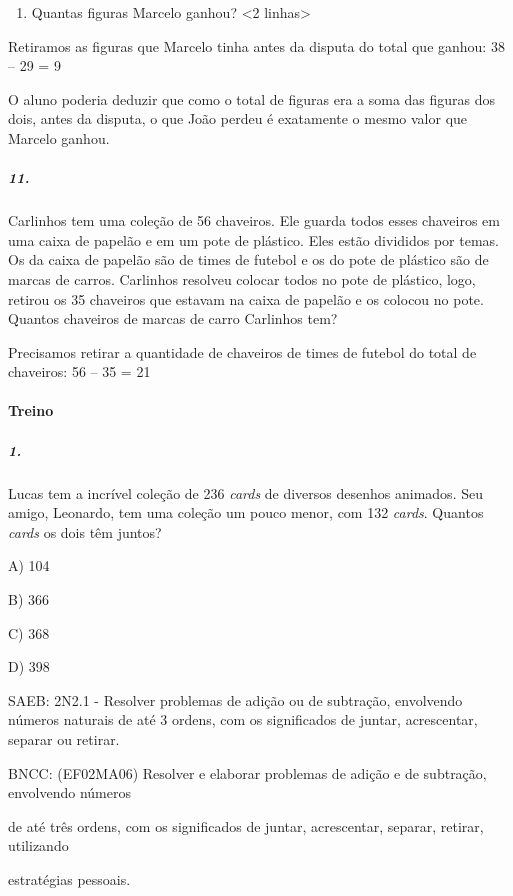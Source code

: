 \begin{enumerate}
\def\labelenumi{\Alph{enumi})}
\item
  Quantas figuras Marcelo ganhou? \textless{}2 linhas\textgreater{}
\end{enumerate}

Retiramos as figuras que Marcelo tinha antes da disputa do total que
ganhou: 38 -- 29 = 9

O aluno poderia deduzir que como o total de figuras era a soma das
figuras dos dois, antes da disputa, o que João perdeu é exatamente o
mesmo valor que Marcelo ganhou.

\subparagraph{11.}\label{section-24}

Carlinhos tem uma coleção de 56 chaveiros. Ele guarda todos esses
chaveiros em uma caixa de papelão e em um pote de plástico. Eles estão
divididos por temas. Os da caixa de papelão são de times de futebol e os
do pote de plástico são de marcas de carros. Carlinhos resolveu colocar
todos no pote de plástico, logo, retirou os 35 chaveiros que estavam na
caixa de papelão e os colocou no pote. Quantos chaveiros de marcas de
carro Carlinhos tem?

Precisamos retirar a quantidade de chaveiros de times de futebol do
total de chaveiros: 56 -- 35 = 21

\paragraph{Treino}\label{treino-1}

\subparagraph{1.}\label{section-25}

Lucas tem a incrível coleção de 236 \emph{cards} de diversos desenhos
animados. Seu amigo, Leonardo, tem uma coleção um pouco menor, com 132
\emph{cards}. Quantos \emph{cards} os dois têm juntos?

A) 104

B) 366

C) 368

D) 398

SAEB: 2N2.1 - Resolver problemas de adição ou de subtração, envolvendo
números naturais de até 3 ordens, com os significados de juntar,
acrescentar, separar ou retirar.

BNCC: (EF02MA06) Resolver e elaborar problemas de adição e de subtração,
envolvendo números

de até três ordens, com os significados de juntar, acrescentar, separar,
retirar, utilizando

estratégias pessoais.

